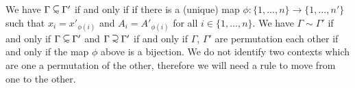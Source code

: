 We have $\Gamma \subseteqsim \Gamma'$ if and only if
if there is a (unique) map $\phi:\{1,\ldots,n\} \rightarrow \{1,\ldots,n'\}$
such that $x_{i}=x'_{\phi(i)}$ and $A_{i}=A'_{\phi(i)}$ for all $i \in \{1,\ldots,n\}$.
We have  $\Gamma \sim \Gamma'$ if and only if  $\Gamma \subseteqsim \Gamma'$
and  $\Gamma \supseteqsim \Gamma'$ if and only if $\Gamma$, $\Gamma'$ are permutation
each other if and only if the map $\phi$ above is a bijection. We do not identify two contexts
which are one a permutation of the other, therefore we will need a rule to move from one to the other.






%
%
%
%
%





